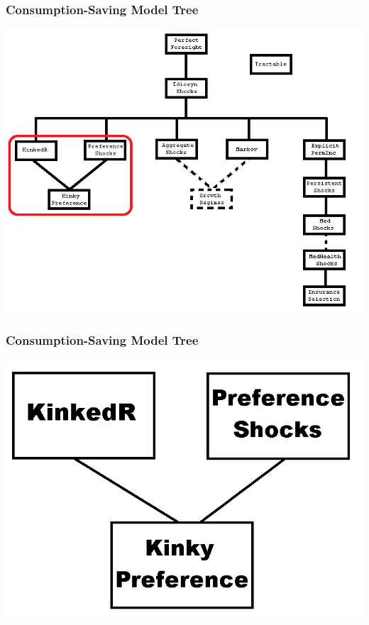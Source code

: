\documentclass{beamer}
\begin{document}
\begin{frame}
  \frametitle{Consumption-Saving Model Tree}
  \begin{center}
    \includegraphics[scale=0.5]{TreeHighlight2.png}
  \end{center}
\end{frame}

\begin{frame}
  \frametitle{Consumption-Saving Model Tree}
  \begin{center}
    \includegraphics[scale=0.5]{TreeZoom2.png}
  \end{center}
\end{frame}
\end{document}
